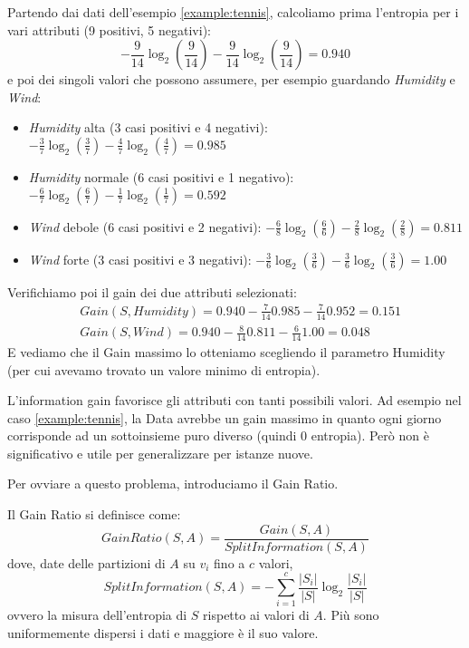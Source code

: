 \begin{example}
	Partendo dai dati dell'esempio \ref{example:tennis}, calcoliamo prima l'entropia per i vari attributi (9 positivi, 5 negativi):
	\begin{equation*}
		-\frac{9}{14} \log_2(\frac{9}{14}) - \frac{9}{14} \log_2(\frac{9}{14})=0.940
	\end{equation*}
	e poi dei singoli valori che possono assumere, per esempio guardando \textit{Humidity} e \textit{Wind}:
	\begin{itemize}
		\item \textit{Humidity} alta (3 casi positivi e 4 negativi): $-\frac{3}{7} \log_2(\frac{3}{7}) - \frac{4}{7} \log_2(\frac{4}{7})=0.985$
		\item \textit{Humidity} normale (6 casi positivi e 1 negativo): $-\frac{6}{7} \log_2(\frac{6}{7}) - \frac{1}{7} \log_2(\frac{1}{7})=0.592$
		\item \textit{Wind} debole (6 casi positivi e 2 negativi): $-\frac{6}{8} \log_2(\frac{6}{6}) - \frac{2}{8} \log_2(\frac{2}{8})=0.811$
		\item \textit{Wind} forte (3 casi positivi e 3 negativi): $-\frac{3}{6} \log_2(\frac{3}{6}) - \frac{3}{6} \log_2(\frac{3}{6})=1.00$
	\end{itemize}
	Verifichiamo poi il gain dei due attributi selezionati:
	\begin{align*}
		& Gain(S, Humidity) = 0.940 - \frac{7}{14} 0.985 - \frac{7}{14} 0.952 = 0.151 \\
		& Gain(S, Wind) = 0.940 - \frac{8}{14} 0.811 - \frac{6}{14} 1.00 = 0.048
	\end{align*}
	E vediamo che il Gain massimo lo otteniamo scegliendo il parametro Humidity (per cui avevamo trovato un valore minimo di entropia).
\end{example}

\begin{observation}
	L'information gain favorisce gli attributi con tanti possibili valori. Ad esempio nel caso \ref{example:tennis}, la Data avrebbe un gain massimo in quanto ogni giorno corrisponde ad un sottoinsieme puro diverso (quindi 0 entropia). Però non è significativo e utile per generalizzare per istanze nuove.
\end{observation}

\newpage
\noindent Per ovviare a questo problema, introduciamo il Gain Ratio.
\begin{definition}
	Il Gain Ratio si definisce come:
	\begin{equation}
		GainRatio(S,A)=\frac{Gain(S,A)}{SplitInformation(S,A)}
	\end{equation}
	dove, date delle partizioni di $A$ su $v_i$ fino a $c$ valori,
	\begin{equation}
		SplitInformation(S,A)=-\sum_{i=1}^{c}\frac{\lvert S_i \rvert}{\lvert S\rvert} \log_2 \frac{\lvert S_i \rvert}{\lvert S \rvert}
	\end{equation}
	ovvero la misura dell'entropia di $S$ rispetto ai valori di $A$. Più sono uniformemente dispersi i dati e maggiore è il suo valore.
\end{definition}

